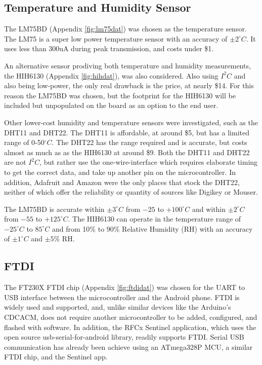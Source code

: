 \documentclass{article}
\numberwithin{figure}{section}
\numberwithin{equation}{section}
\begin{document}
{\subsection{Temperature and Humidity Sensor} \label{sect:temp_just}
The LM75BD (Appendix \ref{fig:lm75dat}) was chosen as the temperature sensor.  The LM75 is a super low power temperature sensor with an accuracy of $\pm2^{\circ}C$. It uses less than 300uA during peak transmission, and costs under \$1.

\bigskip
An alternative sensor prodiving both temperature and humidity measurements, the HIH6130 (Appendix \ref{fig:hihdat}), was also considered. Also using $I^2 C$ and also being low-power, the only real drawback is the price, at nearly \$14. For this reason the LM75BD was chosen, but the footprint for the HIH6130 will be included but unpopulated on the board as an option to the end user.

\bigskip
Other lower-cost humidity and temperature sensors were investigated, such as the DHT11 and DHT22. The DHT11 is affordable, at around \$5, but has a limited range of 0-50$^{\circ}C$. The DHT22 has the range required and is accurate, but costs almost as much as as the HIH6130 at around \$9. Both the DHT11 and DHT22 are not $I^2 C$, but rather use the one-wire-interface which requires elaborate timing to get the correct data, and take up another pin on the microcontroller. In addition, Adafruit and Amazon were the only places that stock the DHT22, neither of which offer the reliability or quantity of sources like Digikey or Mouser.

\bigskip
The LM75BD is accurate within $\pm3^{\circ}C$ from $-25$ to $+100^{\circ}C$ and within $\pm2^{\circ}C$ from $-55$ to $+125^{\circ}C$. The HIH6130 can operate in the temperature range of $-25^{\circ}C$ to $85^{\circ}C$ and from 10\% to 90\% Relative Humidity (RH) with an accuracy of $\pm1^{\circ}C$ and $\pm5$\% RH.

\subsection{FTDI} \label{sect:ftdi_just}
The FT230X FTDI chip (Appendix \ref{fig:ftdidat}) was chosen for the UART to USB interface between the microcontroller and the Android phone. FTDI is widely used and supported, and, unlike similar devices like the Arduino's CDCACM, does not require another microcontroller to be added, configured, and flashed with software. In addition, the RFCx Sentinel application, which uses the open source usb-serial-for-android library, readily supports FTDI. Serial USB communication has already been achieve using an ATmega328P MCU, a similar FTDI chip, and the Sentinel app.

}
\end{document}
